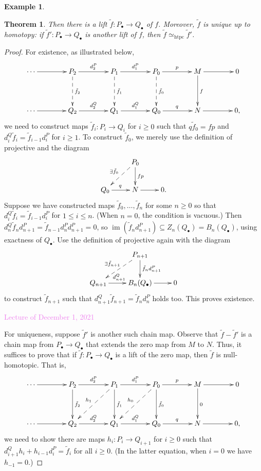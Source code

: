 \documentclass{amsart}[12pt]
\def\htpy{\simeq_{\mathrm{htpc}}}
\def\image{\operatorname{im}}
\def\im{\image}
\newcommand{\Dec}[1]{\textcolor{violet}{Lecture of December #1, 2021}}
\numberwithin{equation}{section}
\theoremstyle{plain} %
\newtheorem{thm}[equation]{Theorem}
\theoremstyle{definition}
\newtheorem{ex}[equation]{Example}
\theoremstyle{remark}
\begin{document}
\begin{ex}
\begin{thm}
    Then there is a lift $\tilde{f}: P_\bullet \to Q_\bullet$ of $f$. Moreover, $\tilde{f}$ is unique up to homotopy: if $\tilde{f}': P_\bullet \to Q_\bullet$ is another lift of $f$, then $\tilde{f} \htpy \tilde{f}'$. 
\end{thm}

\def\tf{\tilde{f}}

\begin{proof} For existence, as illustrated below,
\[\xymatrix@R=4em@C=4em{ \cdots \ar[r] & P_2 \ar[r]^{d^P_2} \ar@{-->}[d]^{\tilde{f}_2} &  P_1 \ar[r]^{d^P_1} \ar@{-->}[d]^{\tilde{f}_1}  & P_0 \ar[r]^{p} \ar@{-->}[d]^{\tilde{f}_0} & M \ar[r] \ar[d]^{f} & 0 \\ 
\cdots \ar[r] & Q_2 \ar[r]^{d^Q_2} &  Q_1 \ar[r]^{d^Q_1} & Q_0 \ar[r]^{q} & N \ar[r] & 0, }\]
we need to construct maps $\tf_i: P_i \to Q_i$ for $i   \geq 0$ such that $q \tf_0 = f  p$
and $d^Q_i  \tf_i = \tf_{i-1}  d^P_i$ for $i \geq 1$. To construct $\tf_0$, we merely use the definition of projective and the diagram
$$
\xymatrix{
& P_0 \ar[d]^{f  p}   \ar@{-->}[dl]_{\exists \tf_0} \\
Q_0 \ar[r]^q & N \ar[r] & 0. \\
}
$$
Suppose we have constructed maps $\tf_0, \dots, \tf_n$ for some $n \geq 0$  so that
 $d^Q_i  \tf_i = \tf_{i-1} d^P_i$ for $1 \leq i \leq n$. (When $n = 0$, the condition is vacuous.) Then $d_n^Q \tf_n d_{n+1}^P = \tf_{n-1} d_n^P d_{n+1}^P = 0$, so $\im(\tf_n d_{n+1}^P )\subseteq Z_{n}(Q_\bullet)=B_{n}(Q_\bullet)$, using exactness of $Q_\bullet$.  Use the definition of projective again with the diagram
$$
\xymatrix{
& P_{n+1} \ar[d]^{\tf_n  d^P_{n+1}}   \ar@{-->}[dl]_{\exists \tf_{n+1}} \\
Q_{n+1} \ar[r]^{d^Q_{n+1}} & B_{n}(Q_\bullet) \ar[r] & 0 
}
$$
 to construct $\tf_{n+1}$ such that  $d^Q_{n+1} \tf_{n+1} = \tf_{n}  d^P_n$ holds too.  This proves existence. 

\Dec{1}


For uniqueness, suppose $\tilde{f}'$ is another such chain map.  Observe that $\tilde{f} - \tilde{f}'$ is a chain map from $P_\bullet \to Q_\bullet$ that extends the zero map from $M$
to $N$. Thus, it suffices to prove that if $\tf: P_\bullet \to Q_\bullet$ is a lift of the zero map, then $\tf$ is null-homotopic. That is, 
\[\xymatrix@R=4em@C=4em{ \cdots \ar[r] & P_2 \ar[r]^{d^P_2} \ar[d]^{\tilde{f}_2} &  P_1 \ar[r]^{d^P_1} \ar[d]^{\tilde{f}_1} \ar@{-->}[dl]_{h_1} & P_0 \ar[r]^{p} \ar[d]^{\tilde{f}_0} \ar@{-->}[dl]_{h_0} & M \ar[r] \ar[d]^{0} & 0 \\ 
\cdots \ar[r] & Q_2 \ar[r]^{d^Q_2} &  Q_1 \ar[r]^{d^Q_1} & Q_0 \ar[r]^{q} & N \ar[r] & 0, }\]
we need to show there are maps
$h_i: P_i \to Q_{i+1}$ for $i \geq 0$ such that $d^Q_{i+1}  h_i + h_{i-1}  d^P_i = \tf_i$ for all $i \geq 0$. (In the latter equation,
when $i = 0$ we have $h_{-1} = 0$.)


\end{proof}
\end{ex}
\end{document}

